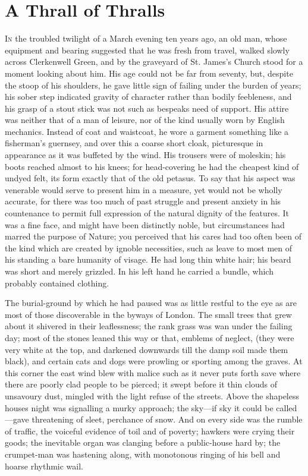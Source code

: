 \chapter{A Thrall of Thralls}

\textsc{In} the troubled twilight of a March evening ten years ago, an
old man, whose equipment and bearing suggested that he was fresh from
travel, walked slowly across Clerkenwell Green, and by the graveyard of
St. James's Church stood for a moment looking about him. His age could
not be far from seventy, but, despite the stoop of his shoulders, he
gave little sign of failing under the burden of years; his sober step
indicated gravity of character rather than bodily feebleness, and his
grasp of a stout stick was not such as bespeaks need of support. His
attire was neither that of a man of leisure, nor of the kind usually
worn by English {\protect\hypertarget{2}{}{}}mechanics. Instead of coat
and waistcoat, he wore a garment something like a fisherman's guernsey,
and over this a coarse short cloak, picturesque in appearance as it was
buffeted by the wind. His trousers were of moleskin; his boots reached
almost to his knees; for head-covering he had the cheapest kind of
undyed felt, its form exactly that of the old petasus. To say that his
aspect was venerable would serve to present him in a measure, yet would
not be wholly accurate, for there was too much of past struggle and
present anxiety in his countenance to permit full expression of the
natural dignity of the features. It was a fine face, and might have been
distinctly noble, but circumstances had marred the purpose of Nature;
you perceived that his cares had too often been of the kind which are
created by ignoble necessities, such as leave to most men of his
standing a bare humanity of visage. He had long thin white hair; his
beard was short and merely grizzled. In his left hand he carried a
bundle, which probably contained clothing.

{\protect\hypertarget{3}{}{}}The burial-ground by which he had paused
was as little restful to the eye as are most of those discoverable in
the byways of London. The small trees that grew about it shivered in
their leaflessness; the rank grass was wan under the failing day; most
of the stones leaned this way or that, emblems of neglect, (they were
very white at the top, and darkened downwards till the damp soil made
them black), and certain cats and dogs were prowling or sporting among
the graves. At this corner the east wind blew with malice such as it
never puts forth save where there are poorly clad people to be pierced;
it swept before it thin clouds of unsavoury dust, mingled with the light
refuse of the streets. Above the shapeless houses night was signalling a
murky approach; the sky---if sky it could be called---gave threatening
of sleet, perchance of snow. And on every side was the rumble of
traffic, the voiceful evidence of toil and of poverty; hawkers were
crying their goods; the inevitable organ was clanging before a
public-house hard by; {\protect\hypertarget{4}{}{}}the crumpet-man was
hastening along, with monotonous ringing of his bell and hoarse rhythmic
wail.

